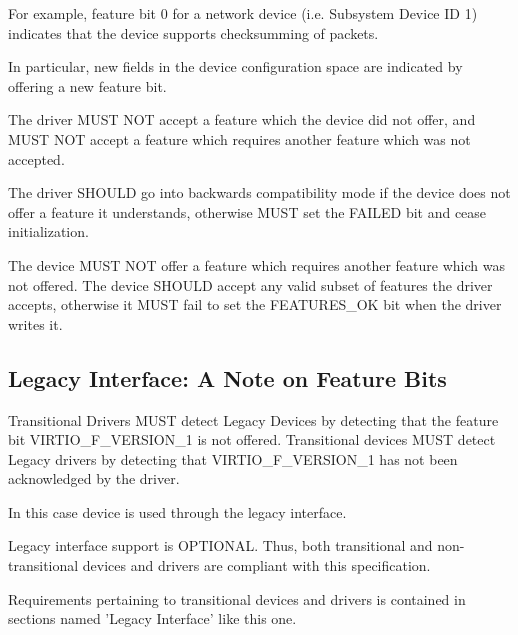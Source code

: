 \begin{note}
For example, feature bit 0 for a network device (i.e. Subsystem
Device ID 1) indicates that the device supports checksumming of
packets.
\end{note}

In particular, new fields in the device configuration space are
indicated by offering a new feature bit.

The driver MUST NOT accept a feature which the device did not offer,
and MUST NOT accept a feature which requires another feature which was
not accepted.

The driver SHOULD go into backwards compatibility mode
if the device does not offer a feature it understands, otherwise MUST
set the FAILED  bit and cease initialization.

The device MUST NOT offer a feature which requires another feature
which was not offered.  The device SHOULD accept any valid subset
of features the driver accepts, otherwise it MUST fail to set the
FEATURES_OK  bit when the driver writes it.

\subsection{Legacy Interface: A Note on Feature
Bits}\label{sec:Basic Facilities of a Virtio Device / Feature
Bits / Legacy Interface: A Note on Feature Bits}

Transitional Drivers MUST detect Legacy Devices by detecting that
the feature bit VIRTIO_F_VERSION_1 is not offered.
Transitional devices MUST detect Legacy drivers by detecting that
VIRTIO_F_VERSION_1 has not been acknowledged by the driver.

In this case device is used through the legacy interface.

Legacy interface support is OPTIONAL.
Thus, both transitional and non-transitional devices and
drivers are compliant with this specification.

Requirements pertaining to transitional devices and drivers
is contained in sections named 'Legacy Interface' like this one.

